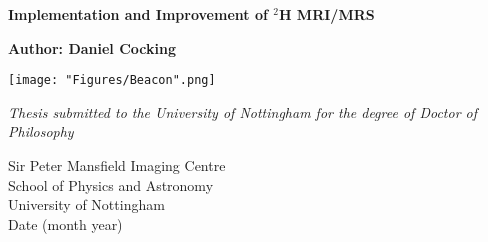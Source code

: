 \documentclass[12pt,english]{report}
\begin{document}
 

\setlength{\headheight}{25pt}

\begin{titlepage}
   \begin{center}
 
       \textbf{\huge{Implementation and Improvement of $^2$H MRI/MRS}}
 
       \vspace{1cm}
 
       \huge{\textbf{Author: Daniel Cocking} \\}
       
       \vspace{1.5cm}
       \texttt{[image: "Figures/Beacon".png]}
       \vspace{1.5cm}
       
       \Large{\emph{Thesis submitted to the University of Nottingham for the degree of Doctor of Philosophy}} 
 
 \vspace{2cm}
 
       Sir Peter Mansfield Imaging Centre \\
       School of Physics and Astronomy\\
       University of Nottingham\\
       Date (month year)
 
   \end{center}
\end{titlepage}

\mbox{}
\thispagestyle{empty}
\begin{abstract}
    \thispagestyle{plain}
    \setcounter{page}{1}
    \blindtext
\end{abstract}
\newpage
\mbox{}

\renewcommand{\abstractname}{Acknowledgements}
\begin{abstract}
    \thispagestyle{plain}
    \setcounter{page}{2}
    \blindtext
\end{abstract}
\newpage
\mbox{}

\setcounter{page}{3}
\tableofcontents

\pagestyle{fancy}
\fancyhf{}
\renewcommand{\headrulewidth}{1 pt}
\renewcommand{\headrule}{\hbox to\headwidth{\color{gray}\leaders\hrule height \headrulewidth\hfill}}
\end{document}

